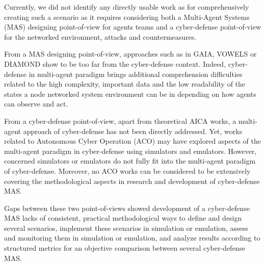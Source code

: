 \documentclass[conference]{IEEEtran}
\begin{document}

Currently, we did not identify any directly usable work as for comprehensively creating such a scenario as it requires considering both a Multi-Agent Systems (MAS) designing point-of-view for agents teams and a cyber-defense point-of-view for the networked environment, attacks and countermeasures.

From a MAS designing point-of-view, approaches such as in GAIA\cite{wooldridge2000gaia}, VOWELS\cite{demazeau2002} or DIAMOND\cite{jamont2007} show to be too far from the cyber-defense context. Indeed, cyber-defense in multi-agent paradigm brings additional comprehension difficulties related to the high complexity, important data and the low readability of the states a node networked system environment can be in depending on how agents can observe and act.

From a cyber-defense point-of-view, apart from theoretical AICA works, a multi-agent approach of cyber-defense has not been directly addressed. Yet, works related to Autonomous Cyber Operation (ACO) may have explored aspects of the multi-agent paradigm in cyber-defense using simulators and emulators\cite{Veksler2018-mc,vyas2023automated}. However, concerned simulators or emulators do not fully fit into the multi-agent paradigm of cyber-defense. Moreover, no ACO works can be considered to be extensively covering the methodological aspects in research and development of cyber-defense MAS.

Gaps between these two point-of-views showed development of a cyber-defense MAS lacks of consistent, practical methodological ways to define and design several scenarios, implement these scenarios in simulation or emulation, assess and monitoring them in simulation or emulation, and analyze results according to structured metrics for an objective comparison between several cyber-defense MAS.
\end{document}
